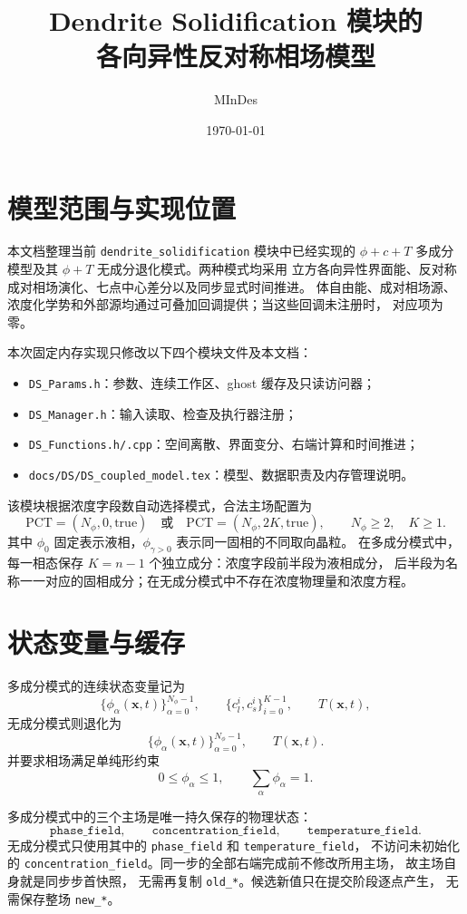 \documentclass[UTF8,a4paper,11pt]{ctexart}
\title{Dendrite Solidification 模块的\\各向异性反对称相场模型}
\author{MInDes}
\date{\today}
\newcommand{\vct}[1]{\bm{#1}}
\begin{document}
\maketitle
\tableofcontents

\section{模型范围与实现位置}

本文档整理当前 \texttt{dendrite\_solidification} 模块中已经实现的
\(\phi+c+T\) 多成分模型及其 \(\phi+T\) 无成分退化模式。两种模式均采用
立方各向异性界面能、反对称成对相场演化、七点中心差分以及同步显式时间推进。
体自由能、成对相场源、浓度化学势和外部源均通过可叠加回调提供；当这些回调未注册时，
对应项为零。

本次固定内存实现只修改以下四个模块文件及本文档：
\begin{itemize}
  \item \texttt{DS\_Params.h}：参数、连续工作区、ghost 缓存及只读访问器；
  \item \texttt{DS\_Manager.h}：输入读取、检查及执行器注册；
  \item \texttt{DS\_Functions.h/.cpp}：空间离散、界面变分、右端计算和时间推进；
  \item \texttt{docs/DS/DS\_coupled\_model.tex}：模型、数据职责及内存管理说明。
\end{itemize}

该模块根据浓度字段数自动选择模式，合法主场配置为
\[
  \mathrm{PCT}=(N_\phi,0,\mathrm{true})
  \quad\text{或}\quad
  \mathrm{PCT}=(N_\phi,2K,\mathrm{true}),
  \qquad N_\phi\geq2,\quad K\geq1.
\]
其中 \(\phi_0\) 固定表示液相，\(\phi_{\gamma>0}\) 表示同一固相的不同取向晶粒。
在多成分模式中，每一相态保存 \(K=n-1\) 个独立成分：浓度字段前半段为液相成分，
后半段为名称一一对应的固相成分；在无成分模式中不存在浓度物理量和浓度方程。

\section{状态变量与缓存}

多成分模式的连续状态变量记为
\[
  \{\phi_\alpha(\vct{x},t)\}_{\alpha=0}^{N_\phi-1},
  \qquad \{c_l^i,c_s^i\}_{i=0}^{K-1},\qquad T(\vct{x},t),
\]
无成分模式则退化为
\[
  \{\phi_\alpha(\vct{x},t)\}_{\alpha=0}^{N_\phi-1},\qquad T(\vct{x},t).
\]
并要求相场满足单纯形约束
\[
  0\leq \phi_\alpha\leq 1,\qquad
  \sum_\alpha\phi_\alpha=1.
\]

多成分模式中的三个主场是唯一持久保存的物理状态：
\begin{equation}
 \texttt{phase\_field},\qquad
 \texttt{concentration\_field},\qquad
 \texttt{temperature\_field}.
\end{equation}
无成分模式只使用其中的 \texttt{phase\_field} 和 \texttt{temperature\_field}，
不访问未初始化的 \texttt{concentration\_field}。同一步的全部右端完成前不修改所用主场，
故主场自身就是同步步首快照，
无需再复制 \texttt{old\_*}。候选新值只在提交阶段逐点产生，
无需保存整场 \texttt{new\_*}。
\end{document}
